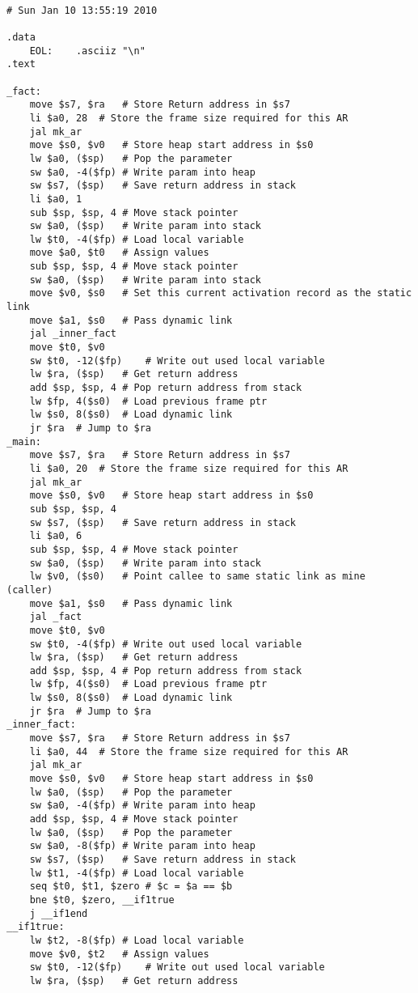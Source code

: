 \begin{lstlisting}[showstringspaces=false,breaklines=true,backgroundcolor=\color{light-gray}, captionpos=b]
         
# Sun Jan 10 13:55:19 2010

.data
	EOL:	.asciiz "\n"
.text

_fact:
	move $s7, $ra	# Store Return address in $s7
	li $a0, 28	# Store the frame size required for this AR
	jal mk_ar
	move $s0, $v0	# Store heap start address in $s0
	lw $a0, ($sp)	# Pop the parameter
	sw $a0, -4($fp)	# Write param into heap
	sw $s7, ($sp)	# Save return address in stack
	li $a0, 1
	sub $sp, $sp, 4	# Move stack pointer
	sw $a0, ($sp)	# Write param into stack
	lw $t0, -4($fp)	# Load local variable
	move $a0, $t0	# Assign values
	sub $sp, $sp, 4	# Move stack pointer
	sw $a0, ($sp)	# Write param into stack
	move $v0, $s0	# Set this current activation record as the static link
	move $a1, $s0	# Pass dynamic link
	jal _inner_fact
	move $t0, $v0
	sw $t0, -12($fp)	# Write out used local variable
	lw $ra, ($sp)	# Get return address
	add $sp, $sp, 4	# Pop return address from stack
	lw $fp, 4($s0)	# Load previous frame ptr
	lw $s0, 8($s0)	# Load dynamic link
	jr $ra	# Jump to $ra
_main:
	move $s7, $ra	# Store Return address in $s7
	li $a0, 20	# Store the frame size required for this AR
	jal mk_ar
	move $s0, $v0	# Store heap start address in $s0
	sub $sp, $sp, 4
	sw $s7, ($sp)	# Save return address in stack
	li $a0, 6
	sub $sp, $sp, 4	# Move stack pointer
	sw $a0, ($sp)	# Write param into stack
	lw $v0, ($s0)	# Point callee to same static link as mine (caller)
	move $a1, $s0	# Pass dynamic link
	jal _fact
	move $t0, $v0
	sw $t0, -4($fp)	# Write out used local variable
	lw $ra, ($sp)	# Get return address
	add $sp, $sp, 4	# Pop return address from stack
	lw $fp, 4($s0)	# Load previous frame ptr
	lw $s0, 8($s0)	# Load dynamic link
	jr $ra	# Jump to $ra
_inner_fact:
	move $s7, $ra	# Store Return address in $s7
	li $a0, 44	# Store the frame size required for this AR
	jal mk_ar
	move $s0, $v0	# Store heap start address in $s0
	lw $a0, ($sp)	# Pop the parameter
	sw $a0, -4($fp)	# Write param into heap
	add $sp, $sp, 4	# Move stack pointer
	lw $a0, ($sp)	# Pop the parameter
	sw $a0, -8($fp)	# Write param into heap
	sw $s7, ($sp)	# Save return address in stack
	lw $t1, -4($fp)	# Load local variable
	seq $t0, $t1, $zero	# $c = $a == $b
	bne $t0, $zero, __if1true
	j __if1end
__if1true:
	lw $t2, -8($fp)	# Load local variable
	move $v0, $t2	# Assign values
	sw $t0, -12($fp)	# Write out used local variable
	lw $ra, ($sp)	# Get return address

\end{lstlisting}
